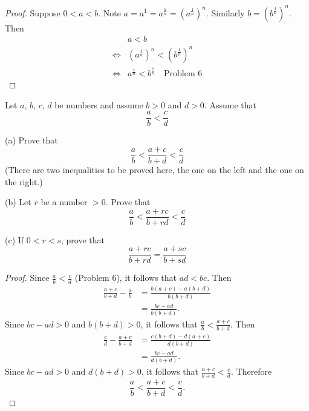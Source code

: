 \begin{proof}
    Suppose $0 < a < b$.
    Note $a = a^{1} = a^{\frac{n}{n}} = \left(a^{\frac{1}{n}}\right)^n$.
    Similarly $b = \left(b^{\frac{1}{n}}\right)^n$.
    Then 
    \begin{align*}
        &a < b \\
        \iff &{\left(a^{\frac{1}{n}}\right)}^{n} < {\left(b^{\frac{1}{n}}\right)}^{n} \\
        \iff &a^{\frac{1}{n}} < b^{\frac{1}{n}} \quad \text{Problem 6}
    \end{align*}
\end{proof}

\begin{tcolorbox}[title=Problem 8, breakable]
    Let $a$, $b$, $c$, $d$ be numbers and assume $b > 0$ and $d > 0$. Assume that 
    \[\frac{a}{b} < \frac{c}{d}\]
    
    (a) Prove that 
    \[\frac{a}{b} < \frac{a + c}{b + d} < \frac{c}{d}\]
    (There are two inequalities to be proved here, the one on the left 
    and the one on the right.)

    (b) Let $r$ be a number $> 0$. Prove that \
    \[\frac{a}{b} < \frac{a + rc}{b + rd} < \frac{c}{d}\]
    
    (c) If $0 < r < s$, prove that 
    \[\frac{a + rc}{b + rd} = \frac{a + sc}{b + sd}\]
\end{tcolorbox}

\begin{proof}
    Since $\tfrac{a}{b} < \tfrac{c}{d}$ (Problem 6), it follows that $ad < bc$.  
    Then
    \begin{align*}
        \frac{a+c}{b+d} - \frac{a}{b}
        &= \frac{b(a+c) - a(b+d)}{b(b+d)} \\
        &= \frac{bc - ad}{b(b+d)}.
    \end{align*}
    Since $bc - ad > 0$ and $b(b+d) > 0$, it follows that $\frac{a}{b} < \frac{a+c}{b+d}$.
    Then
    \begin{align*}
        \frac{c}{d} - \frac{a+c}{b+d}
        &= \frac{c(b+d) - d(a+c)}{d(b+d)} \\
        &= \frac{bc - ad}{d(b+d)}.
    \end{align*}
    Since $bc - ad > 0$ and $d(b+d) > 0$, it follows that $\frac{a+c}{b+d} < \frac{c}{d}$.
    Therefore
    \[
        \frac{a}{b} < \frac{a+c}{b+d} < \frac{c}{d}.
    \]
\end{proof}

